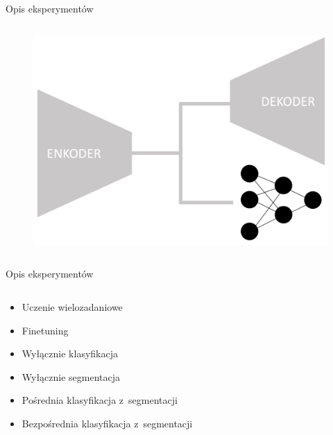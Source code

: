 \documentclass[10pt]{beamer}
\begin{document}
\begin{frame}{Opis eksperymentów}
\begin{columns}
        \begin{column}{0.5\textwidth}
            \begin{figure}
                \includegraphics[width=\textwidth]{images/archs/indirect-classif.png}
            \end{figure}
        \end{column}
    \end{columns}
\end{frame}\begin{frame}{Opis eksperymentów}
    \begin{columns}
        \begin{column}{0.5\textwidth}
            \begin{itemize}
               \item Uczenie wielozadaniowe
               \item Finetuning
               \item Wyłącznie klasyfikacja
               \item Wyłącznie segmentacja
               \item Pośrednia klasyfikacja z~segmentacji
               \item Bezpośrednia klasyfikacja z~segmentacji
            \end{itemize}
        \end{column}


\end{columns}
\end{frame}
\end{document}
